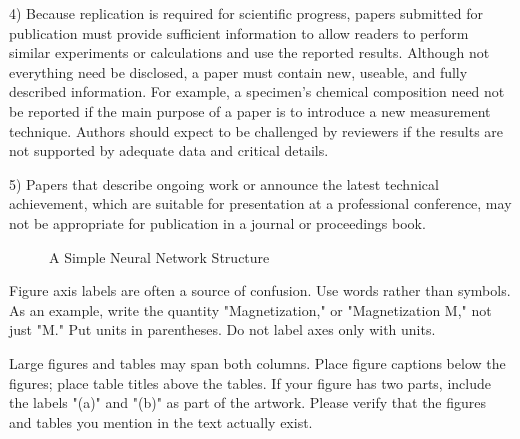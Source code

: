 \documentclass[journal]{IAENGtran}
\begin{document}
4) Because replication is required for scientific progress, papers
submitted for publication must provide sufficient information to
allow readers to perform similar experiments or calculations and use
the reported results. Although not everything need be disclosed, a
paper must contain new, useable, and fully described information.
For example, a specimen's chemical composition need not be reported
if the main purpose of a paper is to introduce a new measurement
technique. Authors should expect to be challenged by reviewers if
the results are not supported by adequate data and critical details.

5)  Papers that describe ongoing work or announce the latest
technical achievement, which are suitable for presentation at a
professional conference, may not be appropriate for publication in a
journal or proceedings book.



%
%

\begin{figure}[!t]
\centering
\caption{A Simple Neural Network Structure}
\label{fig_nn}
\end{figure}


Figure axis labels are often a source of confusion. Use words rather
than symbols. As an example, write the quantity "Magnetization," or
"Magnetization M," not just "M." Put units in parentheses. Do not
label axes only with units.

Large figures and tables may span both columns. Place figure
captions below the figures; place table titles above the tables. If
your figure has two parts, include the labels "(a)" and "(b)" as
part of the artwork. Please verify that the figures and tables you
mention in the text actually exist.
\end{document}
